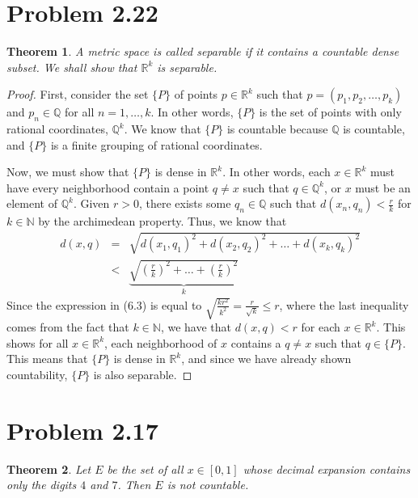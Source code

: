 \documentclass[psamsfonts]{amsart}
\newtheorem{thm}{Theorem}[section]
\theoremstyle{definition}
\theoremstyle{remark}
\numberwithin{equation}{section}
\begin{document}
\section{Problem 2.22}

\begin{thm}
A metric space is called \textit{separable} if it contains a countable dense subset. We shall show that $\mathbb{R}^k$ is separable. 
\end{thm}

\begin{proof}
First, consider the set $\{ P \}$ of points $p \in \mathbb{R}^k$ such that $ p = (p_1, p_2,\dots,p_k)$ and $p_n \in \mathbb{Q}$ for all $n = 1,\ldots,k$. In other words, $\{P\}$ is the set of points with only rational coordinates, $\mathbb{Q}^k$. We know that $\{P\}$ is countable because $\mathbb{Q}$ is countable, and $\{P\}$ is a finite grouping of rational coordinates. 

Now, we must show that $\{P\}$ is dense in $\mathbb{R}^k$. In other words, each $x \in \mathbb{R}^k$ must have every neighborhood contain a point $q \neq x$ such that $q \in \mathbb{Q}^k$, or $x$ must be an element of $\mathbb{Q}^k$. Given $r>0$, there exists some $q_n \in \mathbb{Q}$ such that $d(x_n,q_n) < \frac{r}{k}$ for $k \in \mathbb{N}$ by the archimedean property. Thus, we know that 
\begin{eqnarray}
d(x,q) &=& \sqrt{d(x_1,q_1)^2 + d(x_2,q_2)^2 + \ldots + d(x_k,q_k)^2} \\
&<& \underbrace{\sqrt{ \left(\frac{r}{k}\right)^2 + \ldots + \left(\frac{r}{k} \right)^2}}_{k}
\end{eqnarray}
Since the expression in (6.3) is equal to $\sqrt{\frac{k r^2}{k^2}} = \frac{r}{\sqrt{k}} \leq r$, where the last inequality comes from the fact that $k \in \mathbb{N}$, we have that $d(x,q) < r$ for each $x \in \mathbb{R}^k$. This shows for all $x \in \mathbb{R}^k$, each neighborhood of $x$ contains a $q \neq x$ such that $ q \in \{ P \}$. This means that $\{P\}$ is dense in $\mathbb{R}^k$, and since we have already shown countability, $\{P\}$ is also separable.  
\end{proof}


\section{Problem 2.17}

\begin{thm}
Let $E$ be the set of all $x \in [0,1]$ whose decimal expansion contains only the digits $4$ and $7$. Then $E$ is not countable.
\end{thm}
\end{document}

